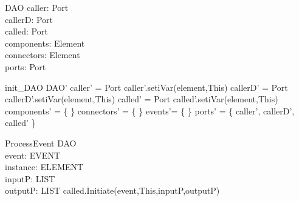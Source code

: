 \begin{schema}{DAO}
caller:  Port \\
callerD:  Port \\
called:  Port \\
components: \pset Element \\
connectors: \pset Element \\
ports: \pset Port
\end{schema}


\begin{zed}
init\_DAO \sdef \lsch DAO'
                  \bbar caller' = \new Port
                  \land caller'.setiVar(element,This)
                  \land callerD' = \new Port
                  \land callerD'.setiVar(element,This)
                  \land called' = \new Port
                  \land called'.setiVar(element,This)
                  \land components' = \{ \}
                  \land connectors' = \{ \}
                  \land events'= \{ \}
                  \land ports' = \{ caller', callerD', called' \}  \rsch
                  \end{zed}


\begin{schema}{ProcessEvent}
\Delta DAO \\
event: EVENT \\
instance: ELEMENT \\
inputP: LIST \\
outputP: LIST
\where
called.Initiate(event,This,inputP,outputP)
\end{schema}